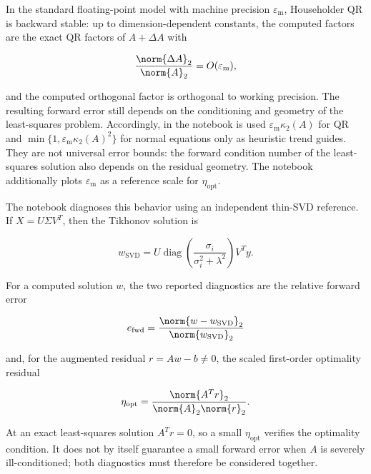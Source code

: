 \noindent In the standard floating-point model with machine precision
$\varepsilon_{\mathrm{m}}$, Householder QR is backward stable: up to
dimension-dependent constants, the computed factors are the exact QR factors
of $A+\Delta A$ with

\begin{equation}
    \frac{\norm{\Delta A}_2}{\norm{A}_2}=O(\varepsilon_{\mathrm{m}}),
\end{equation}

\noindent and the computed orthogonal factor is orthogonal to working precision.
The resulting forward error still depends on the conditioning and geometry of
the least-squares problem. Accordingly, in the notebook is used $\varepsilon_{\mathrm{m}}\kappa_2(A)$ for QR and $\min\{1,\varepsilon_{\mathrm{m}}\kappa_2(A)^{2}\}$ for normal equations only as heuristic trend guides. They are not universal error bounds: the forward condition number of the least-squares solution also depends on the residual geometry. The notebook additionally plots $\varepsilon_{\mathrm{m}}$ as a reference scale for $\eta_{\mathrm{opt}}$.

\noindent The notebook diagnoses this behavior using an independent thin-SVD
reference. If $X=U\Sigma V^T$, then the Tikhonov solution is

\begin{equation}
\label{eq:qr_svd_reference}
    w_{\mathrm{SVD}}
    =U\operatorname{diag}\!\left(
        \frac{\sigma_i}{\sigma_i^2+\lambda^2}
      \right)V^T y.
\end{equation}

\noindent For a computed solution $w$, the two reported diagnostics are the
relative forward error

\begin{equation}
\label{eq:qr_forward_error}
    e_{\mathrm{fwd}}
    =\frac{\norm{w-w_{\mathrm{SVD}}}_2}{\norm{w_{\mathrm{SVD}}}_2}
\end{equation}

\noindent and, for the augmented residual $r=Aw-b\neq0$, the scaled first-order
optimality residual

\begin{equation}
\label{eq:qr_scaled_optimality}
    \eta_{\mathrm{opt}}
    =\frac{\norm{A^T r}_2}{\norm{A}_2\norm{r}_2}.
\end{equation}

\noindent At an exact least-squares solution $A^T r=0$, so a small
$\eta_{\mathrm{opt}}$ verifies the optimality condition. It does not by itself
guarantee a small forward error when $A$ is severely ill-conditioned; both
diagnostics must therefore be considered together.

